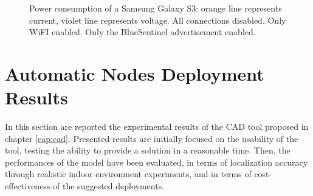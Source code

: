 \begin{figure}
\centering
{}
\newline
{}
\newline
{}
\caption[Power consumption of a Samsung Galaxy S3.]{Power consumption of a Samsung Galaxy S3: orange line represents current, violet line represents voltage. \protect{} All connections disabled. \protect{} Only WiFI enabled. \protect{} Only the BlueSentinel advertisement enabled.}
\label{fig:monsoon-graph}
\end{figure}


\section{Automatic Nodes Deployment Results}
\label{sec:CAD-test}

In this section are reported the experimental results of the CAD tool proposed in chapter \ref{cap:cad}.
Presented results are initially focused on the usability of the tool, testing the ability to provide a solution in a reasonable time. Then, the performances of the model have been evaluated, in terms of localization accuracy through realistic indoor environment experiments, and in terms of cost-effectiveness of the suggested deployments.

